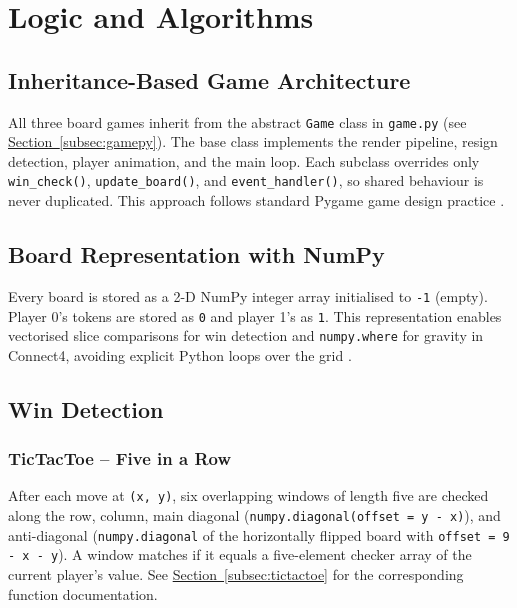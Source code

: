 \documentclass[12pt, a4paper]{article}
\begin{document}
\section{Logic and Algorithms}
\label{sec:algorithms}

\subsection{Inheritance-Based Game Architecture}

All three board games inherit from the abstract \texttt{Game} class in \texttt{game.py} (see \hyperref[subsec:gamepy]{Section~\ref*{subsec:gamepy}}). The base class implements the render pipeline, resign detection, player animation, and the main loop. Each subclass overrides only \texttt{win\_check()}, \texttt{update\_board()}, and \texttt{event\_handler()}, so shared behaviour is never duplicated. This approach follows standard Pygame game design practice \cite{pygame_book}.

\subsection{Board Representation with NumPy}

Every board is stored as a 2-D NumPy \cite{numpy} integer array initialised to \texttt{-1} (empty). Player 0's tokens are stored as \texttt{0} and player 1's as \texttt{1}. This representation enables vectorised slice comparisons for win detection and \texttt{numpy.where} for gravity in Connect4, avoiding explicit Python loops over the grid \cite{numpy_book}.

\subsection{Win Detection}

\subsubsection{TicTacToe -- Five in a Row}
After each move at \texttt{(x, y)}, six overlapping windows of length five are checked along the row, column, main diagonal (\texttt{numpy.diagonal(offset = y - x)}), and anti-diagonal (\texttt{numpy.diagonal} of the horizontally flipped board with \texttt{offset = 9 - x - y}). A window matches if it equals a five-element checker array of the current player's value. See \hyperref[subsec:tictactoe]{Section~\ref*{subsec:tictactoe}} for the corresponding function documentation.
\end{document}
